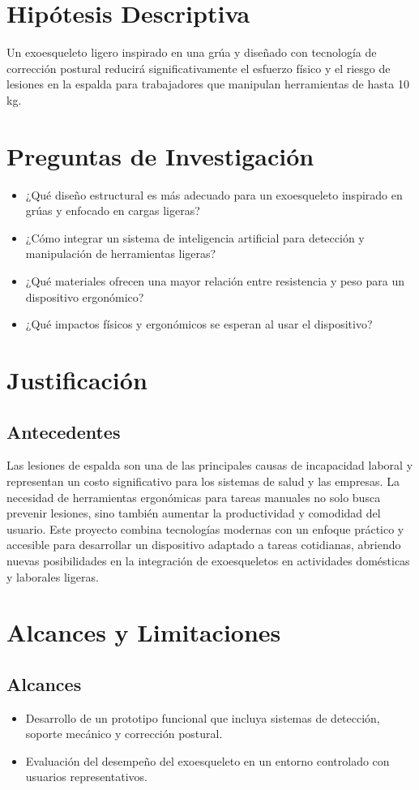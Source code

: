 \section{Hipótesis Descriptiva}
Un exoesqueleto ligero inspirado en una grúa y diseñado con tecnología de corrección postural reducirá significativamente el esfuerzo físico y el riesgo de lesiones en la espalda para trabajadores que manipulan herramientas de hasta 10 kg.


\section{Preguntas de Investigación}
\begin{itemize}
    \item ¿Qué diseño estructural es más adecuado para un exoesqueleto inspirado en grúas y enfocado en cargas ligeras?
    \item ¿Cómo integrar un sistema de inteligencia artificial para detección y manipulación de herramientas ligeras?
    \item ¿Qué materiales ofrecen una mayor relación entre resistencia y peso para un dispositivo ergonómico?
    \item ¿Qué impactos físicos y ergonómicos se esperan al usar el dispositivo?
\end{itemize}


\section{Justificación}
\subsection{Antecedentes}
Las lesiones de espalda son una de las principales causas de incapacidad laboral y representan un costo significativo para los sistemas de salud y las empresas. La necesidad de herramientas ergonómicas para tareas manuales no solo busca prevenir lesiones, sino también aumentar la productividad y comodidad del usuario. Este proyecto combina tecnologías modernas con un enfoque práctico y accesible para desarrollar un dispositivo adaptado a tareas cotidianas, abriendo nuevas posibilidades en la integración de exoesqueletos en actividades domésticas y laborales ligeras.


\section{Alcances y Limitaciones}
\subsection{Alcances}
\begin{itemize}
    \item Desarrollo de un prototipo funcional que incluya sistemas de detección, soporte mecánico y corrección postural.
    \item Evaluación del desempeño del exoesqueleto en un entorno controlado con usuarios representativos.
\end{itemize}

